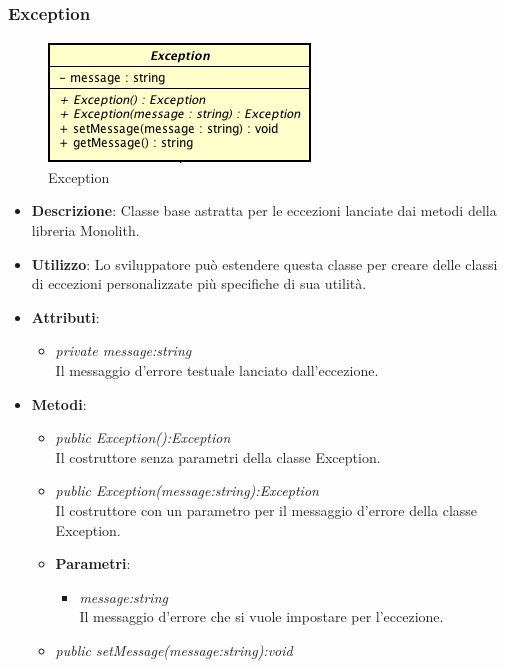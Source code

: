 \subsubsection{Exception}

\label{Exception}
\begin{figure}[ht]
	\centering
	\includegraphics[scale=0.5]{Sezioni/SottosezioniST/img/app/Exception.png}
	\caption{Exception}
\end{figure}

\begin{itemize}
\item \textbf{Descrizione}: Classe base astratta per le eccezioni lanciate dai metodi della libreria Monolith.
\item \textbf{Utilizzo}: Lo sviluppatore può estendere questa classe per creare delle classi di eccezioni personalizzate più specifiche di sua utilità.
\item \textbf{Attributi}: 
	\begin{itemize}
	\item \textit{private message:string}\\
	Il messaggio d'errore testuale lanciato dall'eccezione.
	\end{itemize}
\item \textbf{Metodi}:
	\begin{itemize}
	\item \textit{public Exception():Exception}\\
	Il costruttore senza parametri della classe Exception.
	\item \textit{public Exception(message:string):Exception}\\
	Il costruttore con un parametro per il messaggio d'errore della classe Exception.
			\item{\textbf{Parametri}: \begin{itemize}
			\item \textit{message:string}\\
			Il messaggio d'errore che si vuole impostare per l'eccezione.
			\end{itemize}}
	\item \textit{public setMessage(message:string):void}\\

\end{itemize}
\end{itemize}
